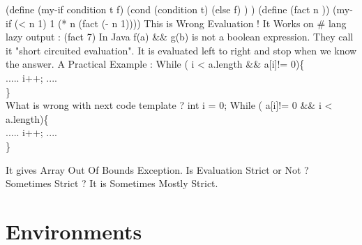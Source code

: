 \documentclass{article}
\begin{document}
(define (my-if condition t f) 
 (cond
  (condition t)
  (else f)
 )
)
\newline
\newline
(define (fact n ))
 (my-if (< n 1) 1 (* n (fact (- n 1))))
 \newline
 This is Wrong Evaluation !
 \newline
 \newline
 It Works on \# lang lazy 
 \newline 
 \newline
 output : 
 \newline
 \newline
 (fact 7) 
 \newline 
 \newline
 In Java f(a) \&\& g(b) is not a boolean expression.
 \newline \newline
 They call it "short circuited evaluation". 
 It is evaluated left to right and stop when we know the answer.
 \newline
 \newline
\newline 
A Practical Example :
\newline
\newline 
While ( i < a.length \&\& a[i]!= 0)\{ \\
    ..... i++; .... \\
    \} \\
\newline
\newline
What is wrong with next code template ?
\newline \newline
int i = 0;
\newline
While ( a[i]!= 0 \&\& i < a.length)\{ \\ 
    ..... i++; .... \\
    \}
\newline
\newline

It gives Array Out Of Bounds Exception.
\newline
\newline
Is Evaluation Strict or Not ? Sometimes Strict ?
\newline
\newline
It is Sometimes Mostly Strict.
\newpage
\section{Environments}
\end{document}

